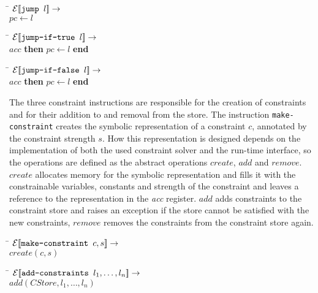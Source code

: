 \begin{tabbing}
\qquad \= \quad \kill
${\mathcal{E}{\normalfont [\![} \text{{\tt jump }} l {\normalfont ]\!]}} \rightarrow$\\
\>$pc \leftarrow l$
\end{tabbing}

\begin{tabbing}
\qquad \= \quad \kill
${\mathcal{E}{\normalfont [\![} \text{{\tt jump-if-true }} l {\normalfont ]\!]}} \rightarrow$\\
 $acc$ {\bf then} $pc \leftarrow l$ {\bf end}
\end{tabbing}

\begin{tabbing}
\qquad \= \quad \kill
${\mathcal{E}{\normalfont [\![} \text{{\tt jump-if-false }} l {\normalfont ]\!]}} \rightarrow$\\
 $acc$ {\bf then} $pc \leftarrow l$ {\bf end}
\end{tabbing}
%
The three constraint instructions are responsible for the creation of
constraints and for their addition to and removal from the store.  The
instruction {\tt make-constraint} creates the symbolic representation
of a constraint $c$, annotated by the constraint strength $s$.  How
this representation is designed depends on the implementation of both
the used constraint solver and the run-time interface, so the
operations are defined as the abstract operations $create$, $add$ and
$remove$.  $create$ allocates memory for the symbolic representation
and fills it with the constrainable variables, constants and strength
of the constraint and leaves a reference to the representation in the
{\em acc} register.  $add$ adds constraints to the constraint store
and raises an exception if the store cannot be satisfied with the new
constraints, $remove$ removes the constraints from the constraint
store again.
%
\begin{tabbing}
\qquad \= \quad \kill
${\mathcal{E}{\normalfont [\![} \text{{\tt make-constraint }} c,s {\normalfont ]\!]}} \rightarrow$\\
\>$create(c, s)$
\end{tabbing}

\begin{tabbing}
\qquad \= \quad \kill
${\mathcal{E}{\normalfont [\![} \text{{\tt add-constraints }} l_1,\dots,l_n {\normalfont ]\!]}} \rightarrow$\\
\>$add (CStore, l_1,\dots,l_n)$
\end{tabbing}

